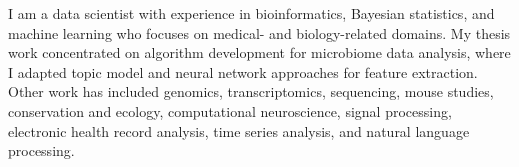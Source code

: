 

\begin{cvparagraph}

I am a data scientist with experience in bioinformatics, Bayesian statistics, and machine learning who focuses on medical- and biology-related domains. My thesis work concentrated on algorithm development for microbiome data analysis, where I adapted topic model and neural network approaches for feature extraction. Other work has included genomics, transcriptomics, sequencing, mouse studies, conservation and ecology, computational neuroscience, signal processing, electronic health record analysis, time series analysis, and natural language processing. 
\end{cvparagraph}